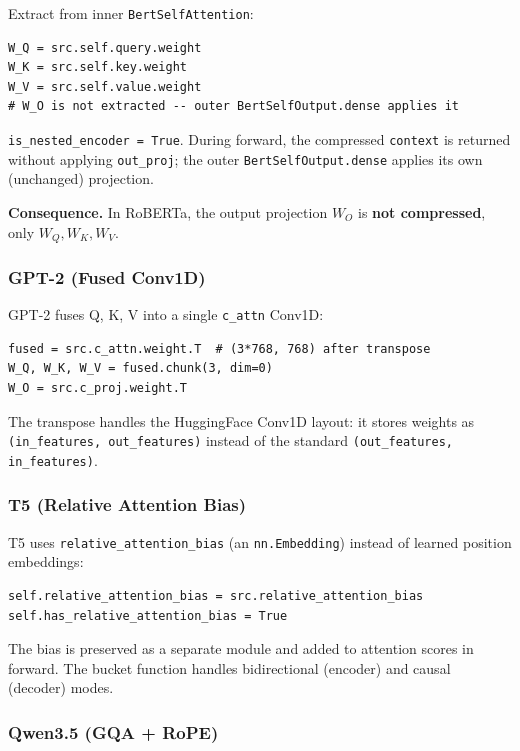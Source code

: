 Extract from inner \texttt{BertSelfAttention}:

\begin{lstlisting}
W_Q = src.self.query.weight
W_K = src.self.key.weight
W_V = src.self.value.weight
# W_O is not extracted -- outer BertSelfOutput.dense applies it
\end{lstlisting}

\texttt{is\_nested\_encoder = True}. During forward, the compressed \texttt{context} is 
returned without applying \texttt{out\_proj}; the outer \texttt{BertSelfOutput.dense} 
applies its own (unchanged) projection.

\textbf{Consequence.} In RoBERTa, the output projection $W_O$ is \textbf{not compressed}, 
only $W_Q, W_K, W_V$.

\subsubsection{GPT-2 (Fused Conv1D)}

GPT-2 fuses Q, K, V into a single \texttt{c\_attn} Conv1D:

\begin{lstlisting}
fused = src.c_attn.weight.T  # (3*768, 768) after transpose
W_Q, W_K, W_V = fused.chunk(3, dim=0)
W_O = src.c_proj.weight.T
\end{lstlisting}

The transpose handles the HuggingFace Conv1D layout: it stores weights as 
\texttt{(in\_features, out\_features)} instead of the standard \texttt{(out\_features, in\_features)}.

\subsubsection{T5 (Relative Attention Bias)}

T5 uses \texttt{relative\_attention\_bias} (an \texttt{nn.Embedding}) instead of learned 
position embeddings:

\begin{lstlisting}
self.relative_attention_bias = src.relative_attention_bias
self.has_relative_attention_bias = True
\end{lstlisting}

The bias is preserved as a separate module and added to attention scores 
in forward. The bucket function handles bidirectional (encoder) and causal 
(decoder) modes.

\subsubsection{Qwen3.5 (GQA + RoPE)}

